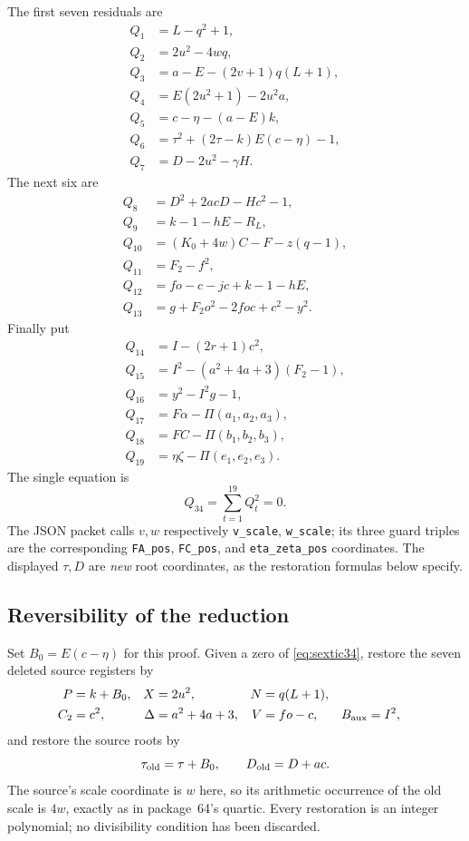 The first seven residuals are
\begin{align*}
 Q_1&=L-q^2+1,\\
 Q_2&=2u^2-4wq,\\
 Q_3&=a-E-(2v+1)q(L+1),\\
 Q_4&=E(2u^2+1)-2u^2a,\\
 Q_5&=c-\eta-(a-E)k,\\
 Q_6&=\tau^2+(2\tau-k)E(c-\eta)-1,\\
 Q_7&=D-2u^2-\gamma H.
\end{align*}
The next six are
\begin{align*}
 Q_8&=D^2+2acD-Hc^2-1,\\
 Q_9&=k-1-hE-R_L,\\
 Q_{10}&=(K_0+4w)C-F-z(q-1),\\
 Q_{11}&=F_2-f^2,\\
 Q_{12}&=fo-c-jc+k-1-hE,\\
 Q_{13}&=g+F_2o^2-2foc+c^2-y^2.
\end{align*}
Finally put
\begin{align*}
 Q_{14}&=I-(2r+1)c^2,\\
 Q_{15}&=I^2-(a^2+4a+3)(F_2-1),\\
 Q_{16}&=y^2-I^2g-1,\\
 Q_{17}&=F\alpha-\Pi(a_1,a_2,a_3),\\
 Q_{18}&=FC-\Pi(b_1,b_2,b_3),\\
 Q_{19}&=\eta\zeta-\Pi(e_1,e_2,e_3).
\end{align*}
The single equation is
\begin{equation}
 \boxed{\quad Q_{34}=\sum_{t=1}^{19}Q_t^2=0.\quad}
 \label{eq:sextic34}
\end{equation}
The JSON packet calls $v,w$ respectively \texttt{v\_scale},
\texttt{w\_scale}; its three guard triples are the corresponding
\texttt{FA\_pos}, \texttt{FC\_pos}, and \texttt{eta\_zeta\_pos}
coordinates.  The displayed $\tau,D$ are \emph{new} root coordinates,
as the restoration formulas below specify.

\subsection{Reversibility of the reduction}

Set $B_0=E(c-\eta)$ for this proof.  Given a zero of
\eqref{eq:sextic34}, restore the seven deleted source registers by
\begin{align*}
 P&=k+B_0,& X&=2u^2,& N&=q(L+1),\\
 C_2&=c^2,&\Delta&=a^2+4a+3,&V&=fo-c,& B_{\rm aux}&=I^2,
\end{align*}
and restore the source roots by
\[
 \tau_{\rm old}=\tau+B_0,\qquad D_{\rm old}=D+ac.
\]
The source's scale coordinate is $w$ here, so its arithmetic occurrence
of the old scale is $4w$, exactly as in package~64's quartic.
Every restoration is an integer polynomial; no divisibility condition has
been discarded.


